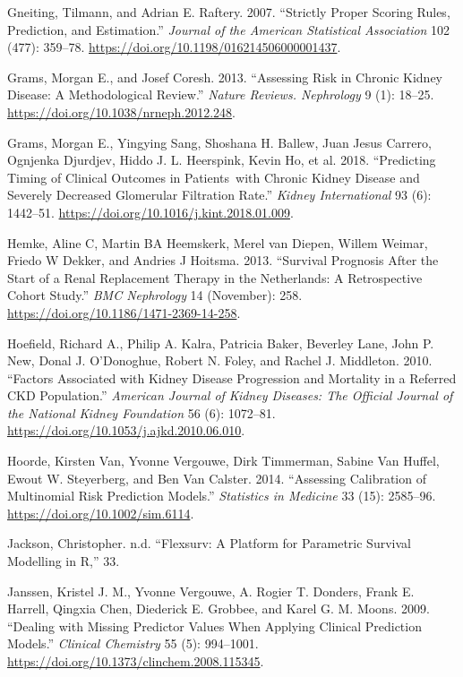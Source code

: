 \documentclass[
]{article}
\newlength{\cslhangindent}
\newenvironment{cslreferences}%
  {\setlength{\parindent}{0pt}%
  \everypar{\setlength{\hangindent}{\cslhangindent}}\ignorespaces}%
  {\par}
\begin{document}
\begin{cslreferences}
\leavevmode\hypertarget{ref-gneiting_strictly_2007}{}%
Gneiting, Tilmann, and Adrian E. Raftery. 2007. ``Strictly Proper Scoring Rules, Prediction, and Estimation.'' \emph{Journal of the American Statistical Association} 102 (477): 359--78. \url{https://doi.org/10.1198/016214506000001437}.

\leavevmode\hypertarget{ref-grams_assessing_2013}{}%
Grams, Morgan E., and Josef Coresh. 2013. ``Assessing Risk in Chronic Kidney Disease: A Methodological Review.'' \emph{Nature Reviews. Nephrology} 9 (1): 18--25. \url{https://doi.org/10.1038/nrneph.2012.248}.

\leavevmode\hypertarget{ref-grams_predicting_2018}{}%
Grams, Morgan E., Yingying Sang, Shoshana H. Ballew, Juan Jesus Carrero, Ognjenka Djurdjev, Hiddo J. L. Heerspink, Kevin Ho, et al. 2018. ``Predicting Timing of Clinical Outcomes in Patients~with Chronic Kidney Disease and Severely Decreased Glomerular Filtration Rate.'' \emph{Kidney International} 93 (6): 1442--51. \url{https://doi.org/10.1016/j.kint.2018.01.009}.

\leavevmode\hypertarget{ref-hemke_survival_2013}{}%
Hemke, Aline C, Martin BA Heemskerk, Merel van Diepen, Willem Weimar, Friedo W Dekker, and Andries J Hoitsma. 2013. ``Survival Prognosis After the Start of a Renal Replacement Therapy in the Netherlands: A Retrospective Cohort Study.'' \emph{BMC Nephrology} 14 (November): 258. \url{https://doi.org/10.1186/1471-2369-14-258}.

\leavevmode\hypertarget{ref-hoefield_factors_2010}{}%
Hoefield, Richard A., Philip A. Kalra, Patricia Baker, Beverley Lane, John P. New, Donal J. O'Donoghue, Robert N. Foley, and Rachel J. Middleton. 2010. ``Factors Associated with Kidney Disease Progression and Mortality in a Referred CKD Population.'' \emph{American Journal of Kidney Diseases: The Official Journal of the National Kidney Foundation} 56 (6): 1072--81. \url{https://doi.org/10.1053/j.ajkd.2010.06.010}.

\leavevmode\hypertarget{ref-hoorde_assessing_2014}{}%
Hoorde, Kirsten Van, Yvonne Vergouwe, Dirk Timmerman, Sabine Van Huffel, Ewout W. Steyerberg, and Ben Van Calster. 2014. ``Assessing Calibration of Multinomial Risk Prediction Models.'' \emph{Statistics in Medicine} 33 (15): 2585--96. \url{https://doi.org/10.1002/sim.6114}.

\leavevmode\hypertarget{ref-jackson_flexsurv_nodate}{}%
Jackson, Christopher. n.d. ``Flexsurv: A Platform for Parametric Survival Modelling in R,'' 33.

\leavevmode\hypertarget{ref-janssen_dealing_2009}{}%
Janssen, Kristel J. M., Yvonne Vergouwe, A. Rogier T. Donders, Frank E. Harrell, Qingxia Chen, Diederick E. Grobbee, and Karel G. M. Moons. 2009. ``Dealing with Missing Predictor Values When Applying Clinical Prediction Models.'' \emph{Clinical Chemistry} 55 (5): 994--1001. \url{https://doi.org/10.1373/clinchem.2008.115345}.


\end{cslreferences}
\end{document}
